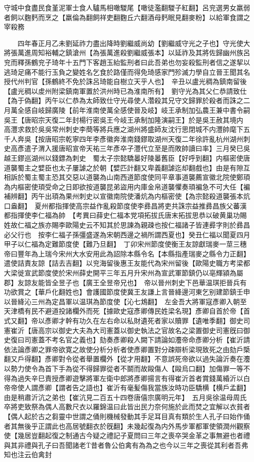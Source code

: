 守城中食盡民食堇泥軍士食人驢馬相噉騣尾【噉徒濫翻騣子紅翻】呂兖選男女羸弱者飼以麴麫而烹之【羸倫為翻飼祥吏翻麴丘六翻酒母麫眠見翻麥粉】以給軍食謂之宰殺務

　　四年春正月乙未劉延祚力盡出降時劉繼威尚幼【劉繼威守光之子也】守光使大將張萬進周知裕輔之鎮滄州【為張萬進殺劉繼威張本】以延祚及其將佐歸幽州族呂兖而釋孫鶴兖子琦年十五門下客趙玉紿監刑者曰此吾弟也勿妄殺監刑者信之遂挈以逃琦足痛不能行玉負之變姓名乞食於路僅而得免琦感家門殄滅力學自立晉王聞其名授代州判官【孫鶴終不免於誅呂琦能自樹立天乎人也】　辛丑以盧光稠為鎮南留後【盧光稠以䖍州附梁鎮南軍置於洪州時已為淮南所有】　劉守光為其父仁恭請致仕【為于偽翻】丙午以仁恭為太師致仕守光尋使人濳殺其兄守文歸罪於殺者而誅之二月萬全感自岐歸廣陵【前年淮南使萬全感使晉及岐】岐王承制加弘農王兼中書令嗣吳王【唐昭宗天復二年封楊行密吳王今岐王承制加隆演嗣王】於是吳王赦其境内　高灃求救於吳吳常州刺史李蕳等將兵應之湖州將盛師友沈行思閉城不内灃帥麾下五千人奔吳【按唐昭宗乾寧四年李彥徽奔淮南錢鏐取湖州天復二年徐許亂杭州湖州刺史高彥遣子渭入援唐昭宣帝天祐三年彥卒子灃代立至是而敗帥讀曰率】三月癸巳吳越王鏐巡湖州以錢鏢為刺史　蜀太子宗懿驕㬥好陵㬥舊臣【好呼到翻】内樞密使唐道襲蜀主之嬖臣也太子屢謔之於朝【嬖匹計翻又卑義翻謔迄却翻戲也】由是有隙互相訴於蜀主蜀主恐其交惡以道襲為山南西道節度使同平章事道襲薦宣徽北院使鄭頊為内樞密使頊受命之日即欲按道襲昆弟盜用内庫金帛道襲懼奏頊褊急不可大任【褊補辨翻】丙午出頊為果州刺史以宣徽南院使潘炕為内樞密使【為宗懿殺道襲張本炕口盎翻】　夏州都指揮使高宗益作亂殺節度使李彞昌將吏共誅宗益推彞昌族父蕃漢都指揮使李仁福為帥　【考異曰薛史仁福本党項拓拔氏唐末拓拔思恭以破黄巢功賜姓故仁福之族亦賜李歐陽史云不知其於思諫為親疎也按仁福諸子皆連彛字則於彞昌必父行也　按李仁福子孫彊盛遂為宋朝西邊之禍所謂西夏也】癸丑仁福以聞夏四月甲子以仁福為定難節度使【難乃旦翻】　丁卯宋州節度使衡王友諒獻瑞麥一莖三穗帝曰豐年為上瑞今宋州大水安用此為詔除本縣令名【本縣指產瑞麥之縣令力正翻】遣使詰責友諒【詰去吉翻】以兖海留後惠王友能代為宋州留後【歐陽史職方考梁都大梁徙宣武節度使於宋州薛史開平三年五月升宋州為宣武軍節鎮仍以亳輝潁為屬郡】友諒友能皆全昱子也【廣王全昱帝兄也】　帝以晉州刺史下邑華温琪拒晉兵有功欲賞之【華戶化翻姓也】會護國節度使冀王友謙上言晉絳邊河東乞别建節鎮壬申以晉絳沁三州為定昌軍以温琪為節度使【沁七鴆翻】　左金吾大將軍寇彥卿入朝至天津橋有民不避道投諸欄外而死【據歐史寇彥卿傳民姓梁名現】彥卿自首於帝【首式又翻】帝以彥卿才幹有功久在左右命以私財遺死者家以贖罪【遺唯季翻】御史司憲崔沂【唐高宗以御史大夫為大司憲蓋以御史執法之官故名之梁置御史司憲旣曰御史復曰司憲蓋不考名官之義也】劾奏彥卿殺人闕下請論如灋帝命彥卿分析【崔沂請依法論彥卿之罪帝欲寛之故使分析分析者使彥卿置對分疎辯析梁現致死之由劾戶㮣翻又戶得翻】彥卿對令從者舉置欄外【從才用翻】不意誤死帝欲以過失論沂奏在灋以勢力使令為首下手為從不得歸罪從者不鬬而故毆傷人【毆烏口翻】加傷罪一等不得為過失辛巳責授彥卿遊擊將軍左衛中郎將彥卿揚言有得崔沂首者賞錢萬緍沂以白帝帝使人謂彥卿【謂者告之語也】崔沂有毫髪傷我當族汝時功臣驕横【横戶孟翻】由是稍肅沂沆之弟也【崔沆見二百五十四卷唐僖宗廣明元年】　五月吳徐温母周氏卒將吏致祭為偶人高數尺衣以羅錦温曰此皆出民力奈何施於此而焚之宜解以衣貧者【偶人起於古之芻靈中世謂之俑則機械發動其手足耳目真有類於生人孔子曰始作俑者其無後乎正謂此也高居號翻衣於旣翻】未幾起復為内外馬步軍都軍使領潤州觀察使【幾居豈翻起復之制通古今疑之禮記子夏問曰三年之喪卒哭金革之事無避也者禮與其非禮與孔子曰吾聞諸老昔者魯公伯禽有為為之也今以三年之喪從其利者吾弗知也注云伯禽封